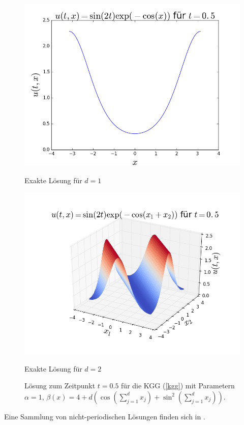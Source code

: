 \begin{figure}[!htb]
  \includegraphics[width=\linewidth]{Figures/kgg_exact_solution_example1d.png}
  \caption{Exakte Lösung für $d=1$}
\endminipage
{}
  \includegraphics[width=\linewidth]{Figures/kgg_exact_solution_example2d.png}
  \caption{Exakte Lösung für $d=2$}
\endminipage
\captionsetup{labelformat=empty}
\caption{Lösung zum Zeitpunkt $t=0.5$ für die KGG (\ref{kgg}) mit Parametern $\alpha=1$, $
\beta(x)=4+d(\cos(\sum_{j=1}^dx_j)+\sin^2(\sum_{j=1}^dx_j))$.}
\end{figure}

Eine Sammlung von nicht-periodischen Lösungen finden sich in \autocite{andreipolyanin2004}.


